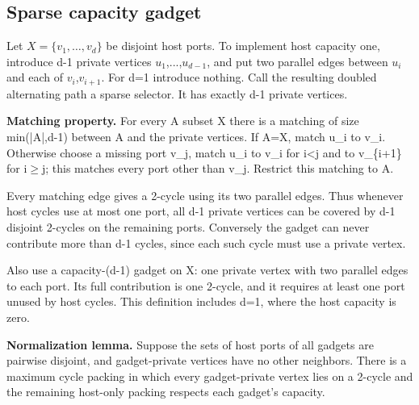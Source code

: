 \documentclass[11pt]{article}
\begin{document}
\subsection{Sparse capacity gadget}

Let $X=\{v_1,\ldots,v_d\}$ be disjoint host ports. To implement host capacity one, introduce d-1 private vertices $u_1$,...,$u_{d-1}$, and put two parallel edges between $u_i$ and each of $v_i$,$v_{i+1}$. For d=1 introduce nothing. Call the resulting doubled alternating path a sparse selector. It has exactly d-1 private vertices.

\textbf{Matching property.} For every A subset X there is a matching of size min(|A|,d-1) between A and the private vertices. If A=X, match u\_i to v\_i. Otherwise choose a missing port v\_j, match u\_i to v\_i for i<j and to v\_\{i+1\} for i\(\ge\)j; this matches every port other than v\_j. Restrict this matching to A.

Every matching edge gives a 2-cycle using its two parallel edges. Thus whenever host cycles use at most one port, all d-1 private vertices can be covered by d-1 disjoint 2-cycles on the remaining ports. Conversely the gadget can never contribute more than d-1 cycles, since each such cycle must use a private vertex.

Also use a capacity-(d-1) gadget on X: one private vertex with two parallel edges to each port. Its full contribution is one 2-cycle, and it requires at least one port unused by host cycles. This definition includes d=1, where the host capacity is zero.

\textbf{Normalization lemma.} Suppose the sets of host ports of all gadgets are pairwise disjoint, and gadget-private vertices have no other neighbors. There is a maximum cycle packing in which every gadget-private vertex lies on a 2-cycle and the remaining host-only packing respects each gadget's capacity.
\end{document}
